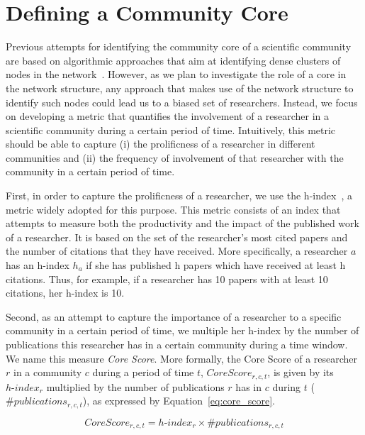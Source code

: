 \section{Defining a Community Core}

Previous attempts for identifying the community core of a scientific community are based on algorithmic approaches that aim at identifying dense clusters of nodes in the
network~\cite{Seifi:2012:CCE:2187980.2188258}.  However, as we plan to investigate the role of a core in the network structure, any approach that makes use of the network structure
to identify such nodes could lead us to a biased set of researchers. Instead, we focus on developing a metric that quantifies the involvement of a researcher in a scientific community
during a certain period of time.  Intuitively, this metric should be able to capture (i) the prolificness of a researcher in different communities and (ii) the frequency of involvement
of that researcher with the community in a certain period of time.

First, in order to capture the prolificness of a researcher, we use the h-index~\cite{Hirsch:2005}, a metric widely adopted for this purpose. This metric consists of an index that
attempts to measure both the productivity and the impact of the published work of a researcher. It is based on the set of the researcher's most cited papers and the number of
citations that they have received.  More specifically, a researcher $a$ has an h-index $h_a$ if she has published h papers which have received at least h citations. Thus, for
example, if a researcher has 10 papers with at least 10 citations, her h-index is 10.  

Second, as an attempt to capture the importance of a researcher to a specific community in a certain period of time, we multiple her h-index by the number of publications this
researcher has in a certain community during a time window. We name this measure \textit{Core Score}. More formally, the Core Score of a researcher $r$ in a community $c$ during a period of
time $t$, $Core{ }Score_{r,c,t}$, is given by its $h\textrm{-}index_r$ multiplied by the number of publications $r$ has in $c$ during $t$ ($\textrm{\#}publications_{r,c,t}$),
as expressed by Equation~\ref{eq:core_score}. 

\begin{equation} 
  \label{eq:core_score}
  Core{ }Score_{r,c,t} = h\textrm{-}index_r \times \textrm{\#}publications_{r,c,t}
\end{equation}

